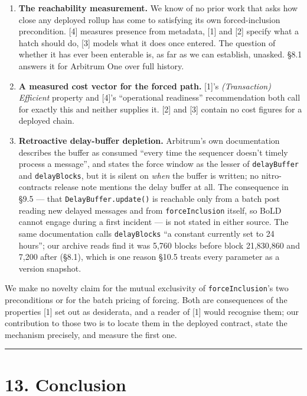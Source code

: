 \documentclass[conference]{IEEEtran}
\renewcommand{\_}{\textunderscore\allowbreak}
\begin{document}
\begin{enumerate}
\def\labelenumi{\arabic{enumi}.}
\item
  \textbf{The reachability measurement.} We know of no prior work that
  asks how close any deployed rollup has come to satisfying its own
  forced-inclusion precondition. {[}4{]} measures presence from
  metadata, {[}1{]} and {[}2{]} specify what a hatch should do, {[}3{]}
  models what it does once entered. The question of whether it has ever
  been enterable is, as far as we can establish, unasked. §8.1 answers
  it for Arbitrum One over full history.
\item
  \textbf{A measured cost vector for the forced path.} {[}1{]}'s
  \emph{(Transaction) Efficient} property and {[}4{]}'s ``operational
  readiness'' recommendation both call for exactly this and neither
  supplies it. {[}2{]} and {[}3{]} contain no cost figures for a
  deployed chain.
\item
  \textbf{Retroactive delay-buffer depletion.} Arbitrum's own
  documentation describes the buffer as consumed ``every time the
  sequencer doesn't timely process a message'', and states the force
  window as the lesser of \texttt{delayBuffer} and \texttt{delayBlocks},
  but it is silent on \emph{when} the buffer is written; no
  nitro-contracts release note mentions the delay buffer at all. The
  consequence in §9.5 --- that \texttt{DelayBuffer.update()} is
  reachable only from a batch post reading new delayed messages and from
  \texttt{forceInclusion} itself, so BoLD cannot engage during a first
  incident --- is not stated in either source. The same documentation
  calls \texttt{delayBlocks} ``a constant currently set to 24 hours'';
  our archive reads find it was 5,760 blocks before block 21,830,860 and
  7,200 after (§8.1), which is one reason §10.5 treats every parameter
  as a version snapshot.
\end{enumerate}

We make no novelty claim for the mutual exclusivity of
\texttt{forceInclusion}'s two preconditions or for the batch pricing of
forcing. Both are consequences of the properties {[}1{]} set out as
desiderata, and a reader of {[}1{]} would recognise them; our
contribution to those two is to locate them in the deployed contract,
state the mechanism precisely, and measure the first one.

\begin{center}\rule{0.5\linewidth}{0.5pt}\end{center}

\section{13. Conclusion}\label{conclusion}
\end{document}
